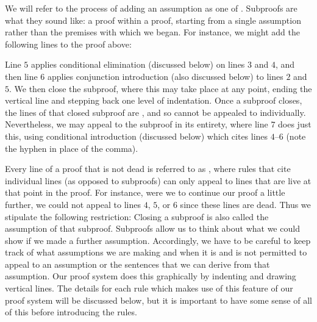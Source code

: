 We will refer to the process of adding an assumption as one of .
Subproofs are what they sound like: a proof within a proof, starting from a single assumption rather than the premises with which we began.
For instance, we might add the following lines to the proof above:
\begin{fitchproof}
   \pr{}
   \pr{}
   
  \open
     \as{}
     
     
  \close
   
\end{fitchproof}
Line $5$ applies conditional elimination (discussed below) on lines $3$ and $4$, and then line $6$ applies conjunction introduction (also discussed below) to lines $2$ and $5$.
We then close the subproof, where this may take place at any point, ending the vertical line and stepping back one level of indentation.
Once a subproof closes, the lines of that closed subproof are , and so cannot be appealed to individually.
Nevertheless, we may appeal to the subproof in its entirety, where line $7$ does just this, using conditional introduction (discussed below) which cites lines $4$--$6$ (note the hyphen in place of the comma).

Every line of a proof that is not dead is referred to as , where rules that cite individual lines (as opposed to subproofs) can only appeal to lines that are live at that point in the proof.
For instance, were we to continue our proof a little further, we could not appeal to lines $4$, $5$, or $6$ since these lines are dead.
Thus we stipulate the following restriction:
Closing a subproof is also called  the assumption of that subproof.
Subproofs allow us to think about what we could show if we made a further assumption.
Accordingly, we have to be careful to keep track of what assumptions we are making and when it is and is not permitted to appeal to an assumption or the sentences that we can derive from that assumption.
Our proof system does this graphically by indenting and drawing vertical lines.
The details for each rule which makes use of this feature of our proof system will be discussed below, but it is important to have some sense of all of this before introducing the rules.





